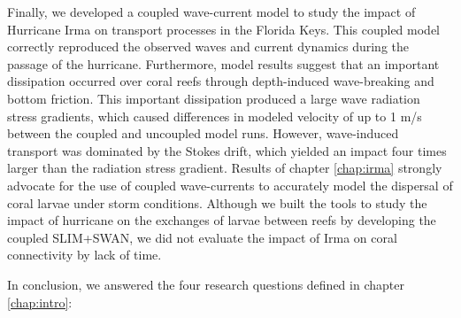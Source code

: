 Finally, we developed a coupled wave-current model to study the impact of Hurricane Irma on transport processes in the Florida Keys. This coupled model correctly reproduced the observed waves and current dynamics during the passage of the hurricane. Furthermore, model results suggest that an important dissipation occurred over coral reefs through depth-induced wave-breaking and bottom friction. This important dissipation produced a large wave radiation stress gradients, which caused differences in modeled velocity of up to 1 m/s between the coupled and uncoupled model runs. However, wave-induced transport was dominated by the Stokes drift, which yielded an impact four times larger than the radiation stress gradient. Results of chapter \ref{chap:irma} strongly advocate for the use of coupled wave-currents to accurately model the dispersal of coral larvae under storm conditions. Although we built the tools to study the impact of hurricane on the exchanges of larvae between reefs by developing the coupled SLIM+SWAN, we did not evaluate the impact of Irma on coral connectivity by lack of time.

In conclusion, we answered the four research questions defined in chapter \ref{chap:intro}:

